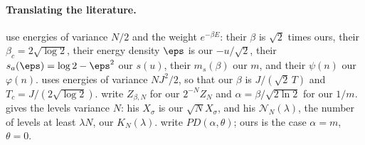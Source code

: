 \begin{refsection}
\paragraph{Translating the literature.} \Textcite{MezardMontanari2009} use energies of variance $N/2$ and the weight $e^{-\beta E}$: their $\beta$ is $\sqrt2$ times ours, their $\beta_c=2\sqrt{\log2}$, their energy density $\eps$ is our $-u/\sqrt2$, their $s_a(\eps)=\log2-\eps^2$ our $s(u)$, their $m_s(\beta)$ our $m$, and their $\psi(n)$ our $\varphi(n)$. \Textcite{Derrida1981} uses energies of variance $NJ^2/2$, so that our $\beta$ is $J/(\sqrt2\,T)$ and $T_c=J/(2\sqrt{\log2})$. \Textcite{BovierKurkovaLowe2002} write $Z_{\beta,N}$ for our $2^{-N}Z_N$ and $\alpha=\beta/\sqrt{2\ln2}$ for our $1/m$. \Textcite{Kistler2015} gives the levels variance $N$: his $X_\sigma$ is our $\sqrt NX_\sigma$, and his $\mathcal N_N(\lambda)$, the number of levels at least $\lambda N$, our $K_N(\lambda)$. \Textcite{PitmanYor1997} write $PD(\alpha,\theta)$; ours is the case $\alpha=m$, $\theta=0$.

\printchapterbib
\end{refsection}
